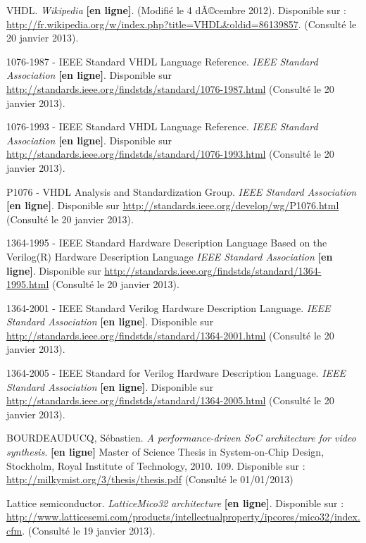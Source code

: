 \documentclass[a4paper]{report}
\begin{document}

\begin{thebibliography}{1}

VHDL. \textit{Wikipedia} \textbf{[en ligne]}. (Modifié le 4 dÃ©cembre 2012). Disponible sur : \url{http://fr.wikipedia.org/w/index.php?title=VHDL\&oldid=86139857}. (Consulté le 20 janvier 2013).

1076-1987 - IEEE Standard VHDL Language Reference. \textit{IEEE Standard Association} \textbf{[en ligne]}. Disponible sur \url{http://standards.ieee.org/findstds/standard/1076-1987.html} (Consulté le 20 janvier 2013).

1076-1993 - IEEE Standard VHDL Language Reference. \textit{IEEE Standard Association} \textbf{[en ligne]}. Disponible sur \url{http://standards.ieee.org/findstds/standard/1076-1993.html} (Consulté le 20 janvier 2013).

P1076 - VHDL Analysis and Standardization Group. \textit{IEEE Standard Association} \textbf{[en ligne]}. Disponible sur \url{http://standards.ieee.org/develop/wg/P1076.html} (Consulté le 20 janvier 2013).

1364-1995 - IEEE Standard Hardware Description Language Based on the Verilog(R) Hardware Description Language \textit{IEEE Standard Association} \textbf{[en ligne]}. Disponible sur \url{http://standards.ieee.org/findstds/standard/1364-1995.html} (Consulté le 20 janvier 2013).

1364-2001 - IEEE Standard Verilog Hardware Description Language. \textit{IEEE Standard Association} \textbf{[en ligne]}. Disponible sur \url{http://standards.ieee.org/findstds/standard/1364-2001.html} (Consulté le 20 janvier 2013).

1364-2005 - IEEE Standard for Verilog Hardware Description Language. \textit{IEEE Standard Association} \textbf{[en ligne]}. Disponible sur \url{http://standards.ieee.org/findstds/standard/1364-2005.html} (Consulté le 20 janvier 2013).

BOURDEAUDUCQ, Sébastien. \textit{A performance-driven SoC architecture for video synthesis}. \textbf{[en ligne]} Master of Science Thesis in System-on-Chip Design, Stockholm, Royal Institute of Technology, 2010. 109. Disponible sur : \url{http://milkymist.org/3/thesis/thesis.pdf} (Consulté le 01/01/2013)

Lattice semiconductor. \textit{LatticeMico32 architecture} \textbf{[en ligne]}. Disponible sur : \url{http://www.latticesemi.com/products/intellectualproperty/ipcores/mico32/index.cfm}. (Consulté le 19 janvier 2013).

\end{thebibliography}

\listoffigures
\end{document}
